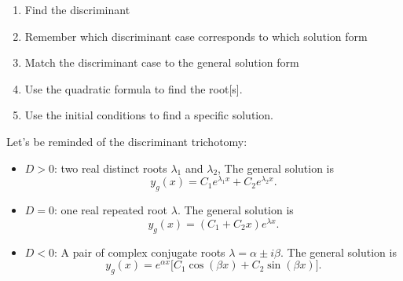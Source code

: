 \documentclass[a4paper,12pt]{article}
\begin{document}
\begin{enumerate}
	\item Find the discriminant
	\item Remember which discriminant case corresponds to which solution form
	\item Match the discriminant case to the general solution form
	\item Use the quadratic formula to find the root[s].
	\item Use the initial conditions to find a specific solution.
\end{enumerate}
Let's be reminded of the discriminant trichotomy:\\
\begin{itemize}
	\item $D>0$: two real distinct roots $\lambda_1$ and $\lambda_2$, The general solution is
$$
y_g(x)=C_1 e^{\lambda_1 x}+C_2 e^{\lambda_2 x}.
$$
\item $D=0$: one real repeated root $\lambda$. The general solution is
$$
y_g(x)=\left(C_1+C_2 x\right) e^{\lambda x}.
$$
\item $D<0$: A pair of complex conjugate roots $\lambda=\alpha \pm i \beta$. The general solution is
$$
y_g(x) =e^{\alpha x}\bigg[C_1\cos (\beta x)+C_2\sin (\beta x)\bigg].
$$


\end{itemize}
\end{document}
